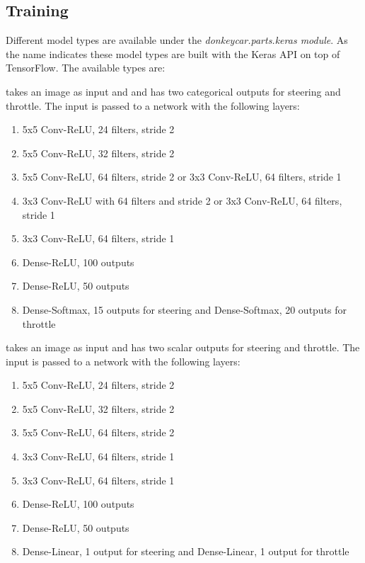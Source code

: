 \documentclass[conference]{IEEEtran}
\begin{document}
\subsection{Training}

Different model types are available under the \textit{donkeycar.parts.keras module}.
As the name indicates these model types are built with the Keras API on top of TensorFlow.
The available types are:
\begin{description}
\setlength\itemsep{.25em}
\item[Categorical] takes an image as input and and has two categorical outputs for steering and throttle. The input is passed to a network with the following layers:
\begin{enumerate}
\item
5x5 Conv-ReLU, 24 filters, stride 2
\item
5x5 Conv-ReLU, 32 filters, stride 2
\item
5x5 Conv-ReLU, 64 filters, stride 2 or 3x3 Conv-ReLU, 64 filters, stride 1
\item
3x3 Conv-ReLU with 64 filters and stride 2 or 3x3 Conv-ReLU, 64 filters, stride 1
\item
3x3 Conv-ReLU, 64 filters, stride 1
\item
Dense-ReLU, 100 outputs
\item
Dense-ReLU, 50 outputs
\item
Dense-Softmax, 15 outputs for steering and Dense-Softmax, 20 outputs for throttle
\end{enumerate}
\item[Linear] takes an image as input and has two scalar outputs for steering and throttle. The input is passed to a network with the following layers:
\begin{enumerate}
\item
5x5 Conv-ReLU, 24 filters, stride 2
\item
5x5 Conv-ReLU, 32 filters, stride 2
\item
5x5 Conv-ReLU, 64 filters, stride 2
\item
3x3 Conv-ReLU, 64 filters, stride 1
\item
3x3 Conv-ReLU, 64 filters, stride 1
\item
Dense-ReLU, 100 outputs
\item
Dense-ReLU, 50 outputs
\item
Dense-Linear, 1 output for steering and Dense-Linear, 1 output for throttle
\end{enumerate}

\end{description}
\end{document}
